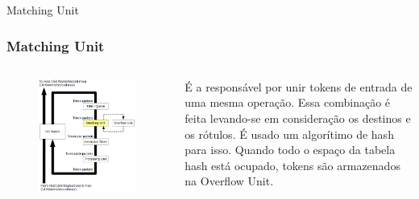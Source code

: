 \documentclass{beamer}
\begin{document}
\begin{frame}{Matching Unit}
	\subsubsection{Matching Unit}
	\begin{columns}
		\column{6cm}
			\begin{figure}
				\centering
				\includegraphics[width=\textwidth]{MatchingUnit}
			\end{figure}

			É a responsável por unir tokens de entrada de uma mesma operação. Essa combinação é feita levando-se em consideração os destinos e os rótulos. É usado um algorítimo de hash para isso. Quando todo o espaço da tabela hash está ocupado, tokens são armazenados na Overflow Unit.
	\end{columns}
\end{frame}
\end{document}
